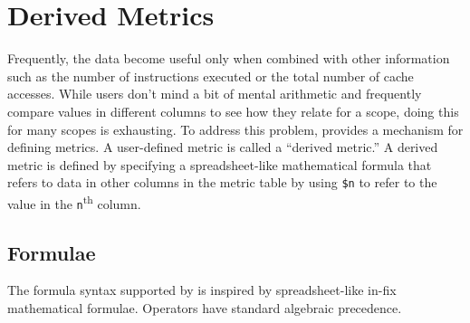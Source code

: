 
\section{Derived Metrics}
\label{sec:hpcviewer:derived-metrics}

Frequently, the data become useful only when combined with other information such as the number of instructions executed or the total number of cache accesses.
While users don't mind a bit of mental arithmetic and frequently compare values in different columns to see how they relate for a scope, doing this for many scopes is exhausting.
To address this problem, \hpcviewer{} provides a mechanism for defining metrics.
A user-defined metric is called a ``derived metric.''
A derived metric is defined by specifying a spreadsheet-like mathematical formula that refers to data in other columns in the metric table by using \texttt{\$n} to refer to the value in the \texttt{n}\textsuperscript{th} column.


\subsection{Formulae}

The formula syntax supported by \hpcviewer{} is inspired by spreadsheet-like in-fix mathematical formulae.
Operators have standard algebraic precedence.
%


